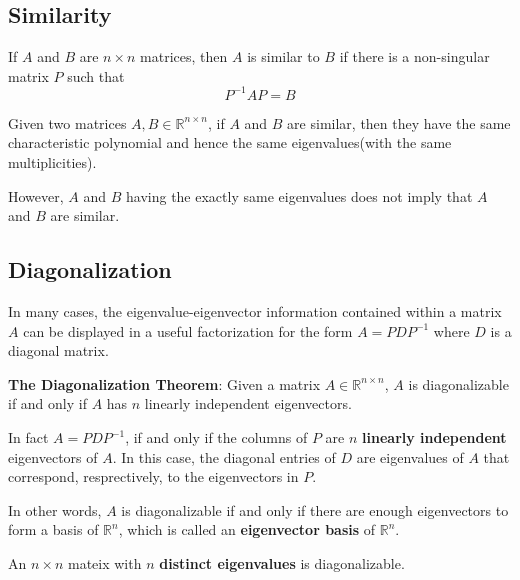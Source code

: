 \subsection{Similarity}
\begin{Def}\label{10-3}
    If $A$ and $B$ are $n\times n$ matrices, then $A$ is similar to $B$ if there is a non-singular matrix $P$ such that
    \begin{equation*}
        P^{-1}AP = B
    \end{equation*}
\end{Def}

\begin{Thm}
    Given two matrices $A, B\in\mathbb{R}^{n\times n}$, if $A$ and $B$ are similar, then they have the same characteristic polynomial and hence the same eigenvalues(with the same multiplicities).
    \begin{Rem}
        However, $A$ and $B$ having the exactly same eigenvalues does not imply that $A$ and $B$ are similar.
    \end{Rem}
\end{Thm}

\subsection{Diagonalization}
In many cases, the eigenvalue-eigenvector information contained within a matrix $A$ can be displayed in a useful factorization for the form $A = PDP^{-1}$ where $D$ is a diagonal matrix. 
\begin{Thm}
    \textbf{The Diagonalization Theorem}: Given a matrix $A\in\mathbb{R}^{n\times n}$, $A$ is diagonalizable if and only if $A$ has $n$ linearly independent eigenvectors.
    \begin{Rem}
        In fact $A = PDP^{-1}$, if and only if the columns of $P$ are $n$ \textbf{linearly independent} eigenvectors of $A$. In this case, the diagonal entries of $D$ are eigenvalues of $A$ that correspond, resprectively, to the eigenvectors in $P$.
    \end{Rem}
\end{Thm}
\noindent In other words, $A$ is diagonalizable if and only if there are enough eigenvectors to form a basis of $\mathbb{R}^n$, which is called an \textbf{eigenvector basis} of $\mathbb{R}^n$.

\begin{Thm}
    An $n\times n$ mateix with $n$ \textbf{distinct eigenvalues} is diagonalizable.
\end{Thm}

